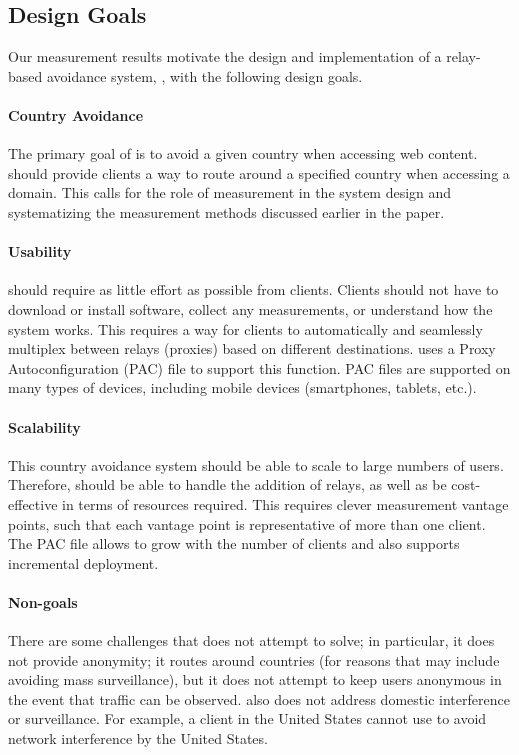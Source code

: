\subsection{Design Goals}
\label{goals}

Our measurement results motivate 
 the design and implementation of a relay-based avoidance system,
\system{}, with the following design goals.

\paragraph{Country Avoidance}  The primary goal of \system{} is to
avoid a given country when accessing web content.  \system{} should
provide clients a way to route around a specified country when
accessing a domain.  This calls for the role of measurement in the
system design and systematizing the measurement methods discussed
earlier in the paper.

\paragraph{Usability} \system{} should require as little effort as
possible from clients.  Clients should not have to download
or install software, collect any measurements, or understand how the
system works.  This requires a way for clients to automatically and
seamlessly multiplex between relays (proxies) based on different
destinations.  \system{} uses a Proxy Autoconfiguration (PAC) file to support this
function.  PAC files are supported on many types of devices, including mobile 
devices (smartphones, tablets, etc.).

\paragraph{Scalability}  This country avoidance system should be able to scale to 
large numbers of users.  Therefore, \system{} should be able to handle the addition
 of relays, as well as be cost-effective in terms of resources required. This requires 
clever measurement vantage points, such that each vantage point is representative of 
more than one client.  The PAC file allows \system{} to 
grow with the number of clients and also supports incremental deployment.

\paragraph{Non-goals}  There are some challenges that \system{} does not
attempt to  solve; in particular, it does not provide anonymity; it routes
around  countries (for reasons that may include avoiding mass surveillance),
but it does not attempt to keep users anonymous in the event that traffic can
be observed.   \system{} also does not address domestic interference or surveillance. For
example, a client in the United States cannot use \system{} to avoid network interference 
by the United States. 

